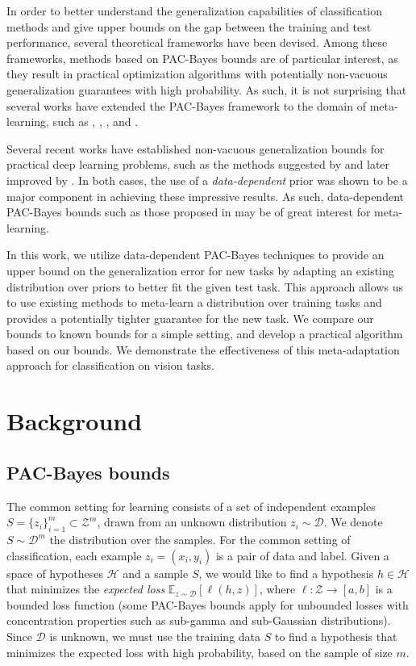 \documentclass[letterpaper]{article} %
\theoremstyle{definition}
\newcommand{\Expect}[2]{\mathbb{E}_{#1}\left [#2 \right ]}
\begin{document}
In order to better understand the generalization capabilities of classification methods and give upper bounds on the gap between the training and test performance, several theoretical frameworks have been devised.  Among these frameworks, methods based on PAC-Bayes bounds \citep{Mcallester} are of particular interest, as they result in practical optimization algorithms with potentially non-vacuous generalization guarantees with high probability. As such, it is not surprising that several works have extended the PAC-Bayes framework to the domain of meta-learning, such as \citet{Pentina2014}, \citet{Amit2018}, \citet{Rothfuss2020}, \citet{Liu2021} and \citet{Farid2021}.

Several recent works have established non-vacuous generalization bounds for practical deep learning problems, such as the methods suggested by \citet{Dziugaite2017} and later improved by \citet{Perez-Ortiz2021}. In both cases, the use of a \emph{data-dependent} prior was shown to be a major component in achieving these impressive results. As such, data-dependent PAC-Bayes bounds such as those proposed in \citet{Rivasplata2020} may be of great interest for meta-learning.

In this work, we utilize data-dependent PAC-Bayes techniques to provide an upper bound on the generalization error for new tasks by adapting an existing distribution over priors to better fit the given test task. This approach allows us to use existing methods to meta-learn a distribution over training tasks and provides a potentially tighter guarantee for the new task.
We compare our bounds to known bounds for a simple setting, and develop a practical algorithm based on our bounds. We demonstrate the effectiveness of this meta-adaptation approach for classification on vision tasks.

\section{Background}

\subsection{PAC-Bayes bounds}

The common setting for learning consists of a set of independent examples $S=\{z_i\}_{i=1}^{m}\subset \mathcal{Z}^m$, drawn from an unknown distribution $z_i\sim \mathcal{D}$. We denote $S\sim \mathcal{D}^m$ the distribution over the samples. 
For the common setting of classification, each example $z_i=(x_i,y_i)$ is a pair of data and label.
Given a space of hypotheses $\mathcal{H}$ and a sample $S$, we would like to find a hypothesis $h\in \mathcal{H}$ that minimizes the \emph{expected loss} $\Expect{z\sim \mathcal{D}}{\ell(h,z)}$, where $\ell:\mathcal{Z}\rightarrow [a,b]$ is a bounded loss function (some PAC-Bayes bounds apply for unbounded losses with concentration properties such as sub-gamma and sub-Gaussian distributions).
Since $\mathcal{D}$ is unknown, we must use the training data $S$ to find a hypothesis that minimizes the expected loss with high probability, based on the sample of size $m$.
\end{document}
